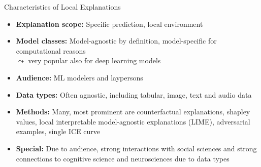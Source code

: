 \documentclass[11pt,compress,t,notes=noshow, aspectratio=169, xcolor=table]{beamer}
\begin{document}
\begin{frame}[t]{Characteristics of Local Explanations}
	\begin{itemize}[<+->]
		\item \textbf{Explanation scope:} Specific prediction, local environment
		\item \textbf{Model classes:} Model-agnostic by definition, model-specific for computational reasons\\
		$\leadsto$ very popular also for deep learning models
		\item \textbf{Audience:} ML modelers and laypersons
		\item \textbf{Data types:} Often agnostic, including tabular, image, text and audio data
		\item \textbf{Methods:} Many, most prominent are counterfactual explanations, shapley values, local interpretable model-agnostic explanations (LIME), adversarial examples, single ICE curve%
		\item \textbf{Special:} Due to audience, strong interactions with social sciences and strong connections to cognitive science and neurosciences due to data types
	\end{itemize}
\end{frame}

\end{document}
